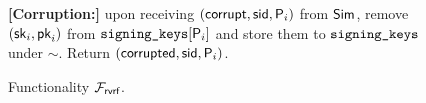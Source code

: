 \begin{figure}
\begin{tcolorbox}[left=2pt,right=2pt]
{				
				\textbf{[Corruption:]} 
				upon receiving $ (\mathsf{corrupt}, \textsf{sid}, \mathsf{P}_i) $ from $ \mathsf{Sim} $, remove $ (\mathsf{sk}_i,\mathsf{pk}_i) $ from $ \texttt{signing\_keys}[\mathsf{P}_i] $ and store them to $ \texttt{signing\_keys} $ under $ \sim $. Return $ (\mathsf{corrupted}, \textsf{sid},\mathsf{P}_i) $.
			}
		\end{tcolorbox}
		\caption{Functionality $\mathcal{F}_{\textsf{rvrf}}$.\label{f:gvrf}}
	\end{figure}
	
	
